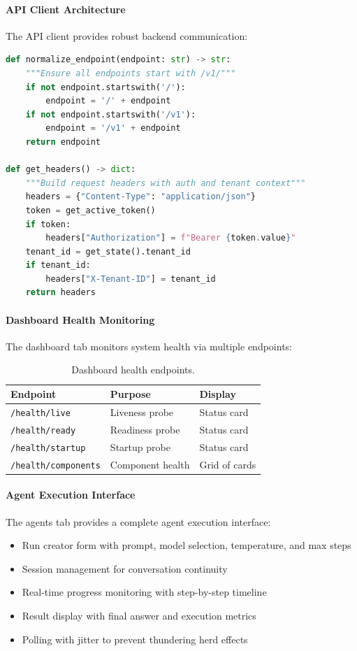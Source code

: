 \paragraph{API Client Architecture}
The API client provides robust backend communication:

\begin{lstlisting}[language=Python, caption={Control Panel API client pattern.}]
def normalize_endpoint(endpoint: str) -> str:
    """Ensure all endpoints start with /v1/"""
    if not endpoint.startswith('/'):
        endpoint = '/' + endpoint
    if not endpoint.startswith('/v1'):
        endpoint = '/v1' + endpoint
    return endpoint

def get_headers() -> dict:
    """Build request headers with auth and tenant context"""
    headers = {"Content-Type": "application/json"}
    token = get_active_token()
    if token:
        headers["Authorization"] = f"Bearer {token.value}"
    tenant_id = get_state().tenant_id
    if tenant_id:
        headers["X-Tenant-ID"] = tenant_id
    return headers
\end{lstlisting}

\paragraph{Dashboard Health Monitoring}
The dashboard tab monitors system health via multiple endpoints:

\begin{table}[htbp]
    \centering
    \caption{Dashboard health endpoints.}
    \label{tab:dashboard-health}
    \small
    \begin{tabular}{lll}
        \toprule
        \textbf{Endpoint} & \textbf{Purpose} & \textbf{Display} \\
        \midrule
        \texttt{/health/live} & Liveness probe & Status card \\
        \texttt{/health/ready} & Readiness probe & Status card \\
        \texttt{/health/startup} & Startup probe & Status card \\
        \texttt{/health/components} & Component health & Grid of cards \\
        \bottomrule
    \end{tabular}
\end{table}

\paragraph{Agent Execution Interface}
The agents tab provides a complete agent execution interface:
\begin{itemize}
    \item Run creator form with prompt, model selection, temperature, and max steps
    \item Session management for conversation continuity
    \item Real-time progress monitoring with step-by-step timeline
    \item Result display with final answer and execution metrics
    \item Polling with jitter to prevent thundering herd effects
\end{itemize}

